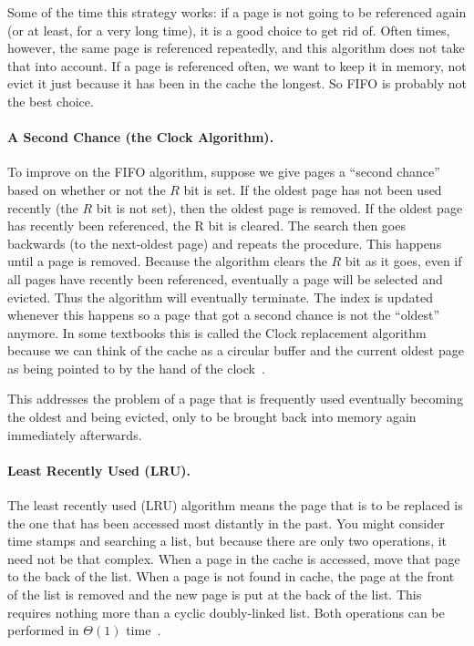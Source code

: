 Some of the time this strategy works: if a page is not going to be referenced again (or at least, for a very long time), it is a good choice to get rid of. Often times, however, the same page is referenced repeatedly, and this algorithm does not take that into account. If a page is referenced often, we want to keep it in memory, not evict it just because it has been in the cache the longest. So FIFO is probably not the best choice.

\paragraph{A Second Chance (the Clock Algorithm).} 
To improve on the FIFO algorithm, suppose we give pages a ``second chance'' based on whether or not the $R$ bit is set. If the oldest page has not been used recently (the $R$ bit is not set), then the oldest page is removed. If the oldest page has recently been referenced, the R bit is cleared. The search then goes backwards (to the next-oldest page) and repeats the procedure. This happens until a page is removed. Because the algorithm clears the $R$ bit as it goes, even if all pages have recently been referenced, eventually a  page will be selected and evicted. Thus the algorithm will eventually terminate. The index is updated whenever this happens so a page that got a second chance is not the ``oldest'' anymore. In some textbooks this is called the Clock replacement algorithm because we can think of the cache as a circular buffer and the current oldest page as being pointed to by the hand of the clock~\cite{mos}. 

This addresses the problem of a page that is frequently used eventually becoming the oldest and being evicted, only to be brought back into memory again immediately afterwards.

\paragraph{Least Recently Used (LRU).}
The least recently used (LRU) algorithm means the page that is to be replaced is the one that has been accessed most distantly in the past. You might consider time stamps and searching a list, but because there are only two operations, it need not be that complex. When a page in the cache is accessed, move that page to the back of the list. When a page is not found in cache, the page at the front of the list is removed and the new page is put at the back of the list. This requires nothing more than a cyclic doubly-linked list. Both operations can be performed in $\Theta(1)$ time~\cite{mte241}.

